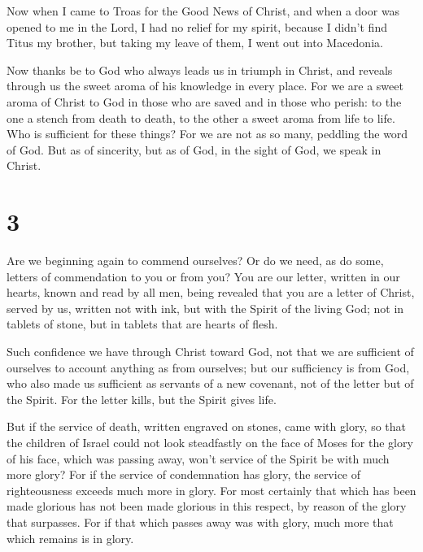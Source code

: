  Now when I came to Troas for the Good News of Christ, and
when a door was opened to me in the Lord,  I had no relief
for my spirit, because I didn't find Titus my brother, but taking my
leave of them, I went out into Macedonia.

 Now thanks be to God who always leads us in triumph in
Christ, and reveals through us the sweet aroma of his knowledge in every
place.  For we are a sweet aroma of Christ to God in those
who are saved and in those who perish:  to the one a stench
from death to death, to the other a sweet aroma from life to life. Who
is sufficient for these things?  For we are not as so many,
peddling the word of God. But as of sincerity, but as of God, in the
sight of God, we speak in Christ.

\hypertarget{section-2}{%
\section{3}\label{section-2}}

 Are we beginning again to commend ourselves? Or do we need,
as do some, letters of commendation to you or from you?  You
are our letter, written in our hearts, known and read by all men,
 being revealed that you are a letter of Christ, served by
us, written not with ink, but with the Spirit of the living God; not in
tablets of stone, but in tablets that are hearts of flesh.

 Such confidence we have through Christ toward God,
 not that we are sufficient of ourselves to account anything
as from ourselves; but our sufficiency is from God,  who
also made us sufficient as servants of a new covenant, not of the letter
but of the Spirit. For the letter kills, but the Spirit gives life.

 But if the service of death, written engraved on stones,
came with glory, so that the children of Israel could not look
steadfastly on the face of Moses for the glory of his face, which was
passing away,  won't service of the Spirit be with much more
glory?  For if the service of condemnation has glory, the
service of righteousness exceeds much more in glory.  For
most certainly that which has been made glorious has not been made
glorious in this respect, by reason of the glory that surpasses.
 For if that which passes away was with glory, much more
that which remains is in glory.

